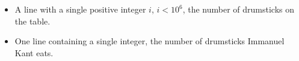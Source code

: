 
\Input
\begin{itemize}
 \item A line with a single positive integer $i$, $i < 10^6$, the number of drumsticks on the table.
\end{itemize}

\Output
\begin{itemize}
 \item One line containing a single integer, the number of drumsticks Immanuel Kant eats.
\end{itemize}

\vfill %
\Example
